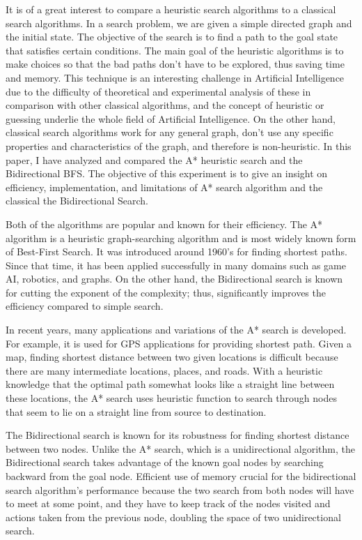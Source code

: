 \documentclass[conference]{IEEEtran}
\begin{document}

It is of a great interest to compare a heuristic search algorithms to a classical search algorithms. In a search problem, we are given a simple directed graph and the initial state. The objective of the search is to find a path to the goal state that satisfies certain conditions. The main goal of the heuristic algorithms is to make choices so that the bad paths don't have to be explored, thus saving time and memory. This technique is an interesting challenge in Artificial Intelligence due to the difficulty of theoretical and experimental analysis of these in comparison with other classical algorithms, and the concept of heuristic or guessing underlie the whole field of Artificial Intelligence. On the other hand, classical search algorithms work for any general graph, don't use any specific properties and characteristics of the graph, and therefore is non-heuristic. In this paper, I have analyzed and compared the A* heuristic search and the Bidirectional BFS. The objective of this experiment is to give an insight on efficiency, implementation, and limitations of A* search algorithm and the classical the Bidirectional Search.

Both of the algorithms are popular and known for their efficiency. The A* algorithm is a heuristic graph-searching algorithm and is most widely known form of Best-First Search. It was introduced around 1960's for finding shortest paths. Since that time, it has been applied successfully in many domains such as game AI, robotics, and graphs. On the other hand, the Bidirectional search is known for cutting the exponent of the complexity; thus, significantly improves the efficiency compared to simple search.

In recent years, many applications and variations of the A* search is developed. For example, it is used for GPS applications for providing shortest path. Given a map, finding shortest distance between two given locations is difficult because there are many intermediate locations, places, and roads. With a heuristic knowledge that the optimal path somewhat looks like a straight line between these locations, the A* search uses heuristic function to search through nodes that seem to lie on a straight line from source to destination.

The Bidirectional search is known for its robustness for finding shortest distance between two nodes. Unlike the A* search, which is a unidirectional algorithm, the Bidirectional search takes advantage of the known goal nodes by searching backward from the goal node. Efficient use of memory crucial for the bidirectional search algorithm's performance because the two search from both nodes will have to meet at some point, and they have to keep track of the nodes visited and actions taken from the previous node, doubling the space of two unidirectional search.
\end{document}
